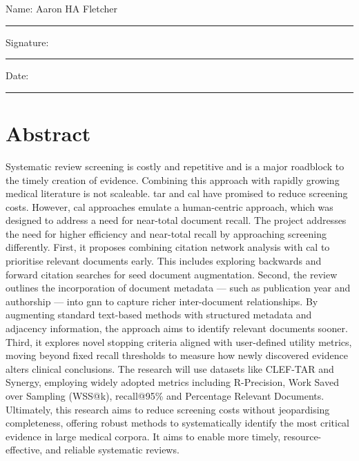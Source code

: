 \documentclass[10pt,oneside]{book}
\begin{document}
\noindent Name: Aaron HA Fletcher\\[1mm]
\rule[1em]{25em}{0.5pt}

\noindent Signature:\\[1mm]
\rule[1em]{25em}{0.5pt}

\noindent Date:\\[1mm]
\rule[1em]{25em}{0.5pt}




\chapter*{\Large \center Abstract}



Systematic review screening is costly and repetitive and is a major roadblock to the timely creation of evidence. Combining this approach with rapidly growing medical literature is not scaleable. \gls*{tar} and \gls*{cal} have promised to reduce screening costs. However, \gls*{cal} approaches emulate a human-centric approach, which was designed to address a need for near-total document recall. The project addresses the need for higher efficiency and near-total recall by approaching screening differently. First, it proposes combining citation network analysis with \gls*{cal} to prioritise relevant documents early. This includes exploring backwards and forward citation searches for seed document augmentation. Second, the review outlines the incorporation of document metadata — such as publication year and authorship — into \gls*{gnn} to capture richer inter-document relationships. By augmenting standard text-based methods with structured metadata and adjacency information, the approach aims to identify relevant documents sooner. Third, it explores novel stopping criteria aligned with user-defined utility metrics, moving beyond fixed recall thresholds to measure how newly discovered evidence alters clinical conclusions. The research will use datasets like CLEF-TAR and Synergy, employing widely adopted metrics including R-Precision, Work Saved over Sampling (WSS@k), recall@95\% and Percentage Relevant Documents. Ultimately, this research aims to reduce screening costs without jeopardising completeness, offering robust methods to systematically identify the most critical evidence in large medical corpora. It aims to enable more timely, resource-effective, and reliable systematic reviews.
    \smallskip
    \smallskip
    
\end{document}
